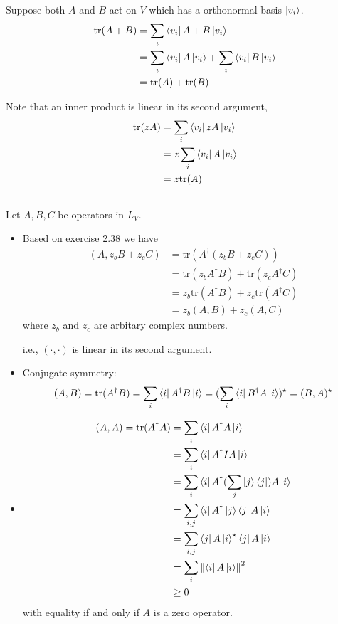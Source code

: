 \documentclass{homeworg}
\begin{document}
\exercise*
Suppose both $A$ and $B$ act on $V$ which has a orthonormal basis $\ket{v_i}$.
\begin{align}
    \text{tr}(A+B)&=\sum_i\bra{v_i}A+B\ket{v_i}\nonumber\\
    &=\sum_i\bra{v_i}A\ket{v_i}+\sum_i\bra{v_i}B\ket{v_i}\nonumber\\
    &=\text{tr}(A)+\text{tr}(B)\nonumber
\end{align}

Note that an inner product is linear in its second argument,
\begin{align}
    \text{tr}(zA)&=\sum_i\bra{v_i}zA\ket{v_i}\nonumber\\
    &=z\sum_i\bra{v_i}A\ket{v_i}\nonumber\\
    &=z\text{tr}(A)\nonumber
\end{align}

\exercise*
\subsection{}
Let $A,B,C$ be operators in $L_V$.
\begin{itemize}
    \item Based on exercise 2.38 we have
    \begin{align}
        (A,z_bB+z_cC)&=\text{tr}(A^\dagger (z_bB+z_cC))\nonumber\\
        &=\text{tr}(z_b A^\dagger B)+\text{tr}(z_c A^\dagger C)\nonumber\\
        &=z_b\text{tr}(A^\dagger B)+z_c\text{tr}(A^\dagger C)\nonumber\\
        &=z_b(A,B)+z_c(A,C)\nonumber
    \end{align}
    where $z_b$ and $z_c$ are arbitary complex numbers.
    
    i.e., $(\cdot,\cdot)$ is linear in its second argument.
    \item Conjugate-symmetry:
    \[(A,B)=\text{tr}(A^\dagger B)=\sum_i \bra{i}A^\dagger B\ket{i}=(\sum_i \bra{i}B^\dagger A\ket{i})^\star=(B,A)^\star\]
    \item 
    \begin{align}
    (A,A)=\text{tr}(A^\dagger A)&=\sum_i\bra{i}A^\dagger A\ket{i}\nonumber\\
    &=\sum_i\bra{i}A^\dagger I A\ket{i}\nonumber\\
    &=\sum_i\bra{i}A^\dagger (\sum_j \ket{j}\bra{j})A\ket{i}\nonumber\\\
    &=\sum_{i,j}\bra{i}A^\dagger \ket{j}\bra{j}A\ket{i}\nonumber\\
    &=\sum_{i,j}\bra{j}A \ket{i}^\star\bra{j}A\ket{i}\nonumber\\
    &=\sum_{i}\left\|\bra{i}A\ket{i}\right\|^2\nonumber\\
    &\geq 0\nonumber
    \end{align}
    with equality if and only if $A$ is a zero operator.
\end{itemize}
\end{document}
